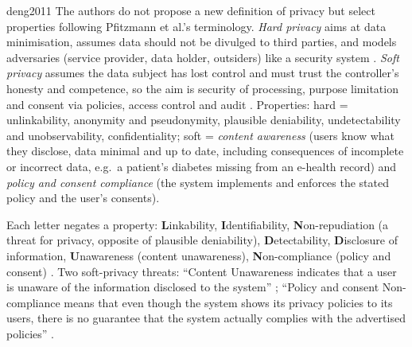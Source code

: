 \begin{papercard}{deng2011}
 The authors do not propose a new definition of privacy but select properties following Pfitzmann et al.'s terminology. \emph{Hard privacy} aims at data minimisation, assumes data should not be divulged to third parties, and models adversaries (service provider, data holder, outsiders) like a security system . \emph{Soft privacy} assumes the data subject has lost control and must trust the controller's honesty and competence, so the aim is security of processing, purpose limitation and consent via policies, access control and audit . Properties: hard = unlinkability, anonymity and pseudonymity, plausible deniability, undetectability and unobservability, confidentiality; soft = \emph{content awareness} (users know what they disclose, data minimal and up to date, including consequences of incomplete or incorrect data, e.g.\ a patient's diabetes missing from an e-health record) and \emph{policy and consent compliance} (the system implements and enforces the stated policy and the user's consents).

 Each letter negates a property: \textbf{L}inkability, \textbf{I}dentifiability, \textbf{N}on-repudiation (a threat for privacy, opposite of plausible deniability), \textbf{D}etectability, \textbf{D}isclosure of information, \textbf{U}nawareness (content unawareness), \textbf{N}on-compliance (policy and consent) . Two soft-privacy threats: ``Content Unawareness indicates that a user is unaware of the information disclosed to the system'' ; ``Policy and consent Non-compliance means that even though the system shows its privacy policies to its users, there is no guarantee that the system actually complies with the advertised policies'' .


\end{papercard}
